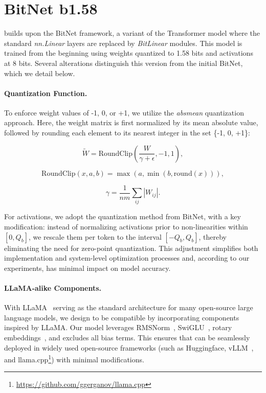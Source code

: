 \section{BitNet b1.58}

 builds upon the BitNet framework, a variant of the Transformer model where the standard \emph{nn.Linear} layers are replaced by \emph{BitLinear} modules. This model is trained from the beginning using weights quantized to 1.58 bits and activations at 8 bits. Several alterations distinguish this version from the initial BitNet, which we detail below.

\paragraph{Quantization Function.} To enforce weight values of -1, 0, or +1, we utilize the \emph{absmean} quantization approach. Here, the weight matrix is first normalized by its mean absolute value, followed by rounding each element to its nearest integer in the set \{-1, 0, +1\}:

\begin{equation}
    \widetilde{W} = \mathrm{RoundClip}(\frac{W}{\gamma + \epsilon}, -1, 1),
\end{equation}

\begin{equation}
    \mathrm{RoundClip}(x, a, b) = \max(a, \min(b, \mathrm{round}(x))),
\end{equation}

\begin{equation}
    \gamma = \frac{1}{nm}\sum_{ij} |W_{ij}|.
\end{equation}

For activations, we adopt the quantization method from BitNet, with a key modification: instead of normalizing activations prior to non-linearities within $[0, Q_b]$, we rescale them per token to the interval $[-Q_b, Q_b]$, thereby eliminating the need for zero-point quantization. This adjustment simplifies both implementation and system-level optimization processes and, according to our experiments, has minimal impact on model accuracy.

\paragraph{LLaMA-alike Components.}

With LLaMA~\cite{llama, llama2} serving as the standard architecture for many open-source large language models, we design  to be compatible by incorporating components inspired by LLaMA. Our model leverages RMSNorm~\cite{rmsnorm}, SwiGLU~\cite{swiglu}, rotary embeddings~\cite{rope}, and excludes all bias terms. This ensures that  can be seamlessly deployed in widely used open-source frameworks (such as Huggingface, vLLM~\cite{vllm}, and llama.cpp\footnote{\url{https://github.com/ggerganov/llama.cpp}}) with minimal modifications.

